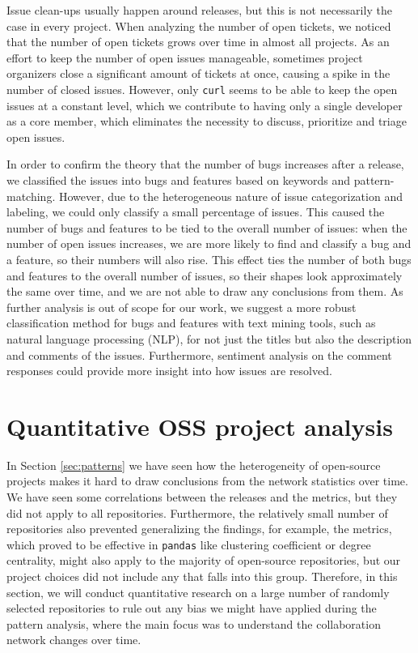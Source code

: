 Issue clean-ups usually happen around releases, but this is not necessarily the case in every project. When analyzing the number of open tickets, we noticed that the number of open tickets grows over time in almost all projects. As an effort to keep the number of open issues manageable, sometimes project organizers close a significant amount of tickets at once, causing a spike in the number of closed issues. However, only \texttt{curl} seems to be able to keep the open issues at a constant level, which we contribute to having only a single developer as a core member, which eliminates the necessity to discuss, prioritize and triage open issues.

In order to confirm the theory that the number of bugs increases after a release, we classified the issues into bugs and features based on keywords and pattern-matching. However, due to the heterogeneous nature of issue categorization and labeling, we could only classify a small percentage of issues. This caused the number of bugs and features to be tied to the overall number of issues: when the number of open issues increases, we are more likely to find and classify a bug and a feature, so their numbers will also rise. This effect ties the number of both bugs and features to the overall number of issues, so their shapes look approximately the same over time, and we are not able to draw any conclusions from them. As further analysis is out of scope for our work, we suggest a more robust classification method for bugs and features with text mining tools, such as natural language processing (NLP), for not just the titles but also the description and comments of the issues. Furthermore, sentiment analysis on the comment responses could provide more insight into how issues are resolved.


\section{Quantitative OSS project analysis}
\label{sec:quantitative}

In Section \ref{sec:patterns} we have seen how the heterogeneity of open-source projects makes it hard to draw conclusions from the network statistics over time. We have seen some correlations between the releases and the metrics, but they did not apply to all repositories. Furthermore, the relatively small number of repositories also prevented generalizing the findings, for example, the metrics, which proved to be effective in \texttt{pandas} like clustering coefficient or degree centrality, might also apply to the majority of open-source repositories, but our project choices did not include any that falls into this group. Therefore, in this section, we will conduct quantitative research on a large number of randomly selected repositories to rule out any bias we might have applied during the pattern analysis, where the main focus was to understand the collaboration network changes over time.

